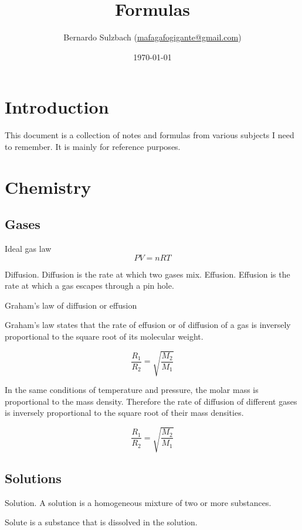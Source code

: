 \documentclass[oneside]{book} %
\title{Formulas}
\author{Bernardo Sulzbach
(\href{mailto:mafagafogigante@gmail.com}{mafagafogigante@gmail.com})}
\date{\today}
\theoremstyle{plain}
\begin{document}
\hypersetup{pageanchor=false} %
\begin{titlepage}
\maketitle
\end{titlepage}
\hypersetup{pageanchor=true}


\tableofcontents

\part{Introduction}
This document is a collection of notes and formulas from various subjects I
need to remember. It is mainly for reference purposes.

\part{Chemistry}

\chapter{Gases}

Ideal gas law
\[PV = nRT\]

Diffusion. Diffusion is the rate at which two gases mix.
Effusion. Effusion is the rate at which a gas escapes through a pin hole.

Graham's law of diffusion or effusion

Graham's law states that the rate of effusion or of diffusion of a gas is
inversely proportional to the square root of its molecular weight.

\[\frac{R_1}{R_2} = \sqrt{\frac{M_2}{M_1}}\]

In the same conditions of temperature and pressure, the molar mass is
proportional to the mass density. Therefore the rate of diffusion of different
gases is inversely proportional to the square root of their mass densities.

\[\frac{R_1}{R_2} = \sqrt{\frac{M_2}{M_1}}\]

\chapter{Solutions}

Solution. A solution is a homogeneous mixture of two or more substances.

Solute is a substance that is dissolved in the solution.
\end{document}
